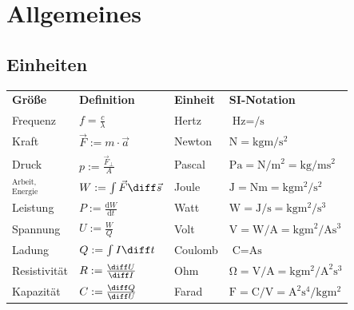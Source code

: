 \documentclass[fs, german]{latex4ei_fs}
\begin{document}

\section{Allgemeines}
\begin{sectionbox}
	\subsection{Einheiten}
	\begin{tabular}{llll} \ctrule
		\textbf{Größe} & \textbf{Definition} & \textbf{Einheit} & \textbf{SI-Notation} \\ \cmrule
		Frequenz & $f = \frac{c}{\lambda}$ & Hertz & $\si{\hertz} = \si{ \per \second}$\\
		Kraft & $ \vec F := m \cdot \vec a $ & Newton & $\si{\newton} = \si{\kilogram \meter \per \second \squared}$\\
		Druck & $p := \frac{\vec F_\perp}{A}$ & Pascal & $\si{\pascal} = \si{\newton \per \meter \squared} = \si{\kilogram \per \meter \second \squared}$\\
		${}^{\textstyle \text{Arbeit,}}_{\textstyle \text{Energie}}$ & $W := \int \vec F \diff \vec s$ & Joule & $\si{\joule} = \si{\newton\meter} = \si{\kilogram\meter \squared \per \second \squared}$ \\
		Leistung & $P := \frac{\mathrm dW}{\mathrm dt}$ & Watt & $\si{\watt} = \si{\joule \per \second} = \si{\kilogram\meter \squared \per \second \cubed}$\\
		Spannung & $U := \frac{W}{Q}$ & Volt & $\si{\volt} = \si{\watt \per \ampere} = \si{\kilogram\meter  \squared \per \ampere\second \cubed}$\\
		Ladung & $Q:= \int I \diff t$ & Coulomb & $\si{\coulomb} = \si{\ampere\second}$\\
		Resistivität & $R := \frac{\diff U}{\diff I}$ & Ohm & $\si{\ohm} = \si{\volt \per \ampere} = \si{\kilogram\meter  \squared \per \ampere  \squared\second \cubed}$\\
		Kapazität & $C:= \frac{\diff Q}{\diff U}$ & Farad & $\si{\farad} = \si{\coulomb \per \volt} = \si{\ampere  \squared  \second \tothe{4}\per \kilogram\meter \squared}$\\	

\end{tabular}
\end{sectionbox}
\end{document}
